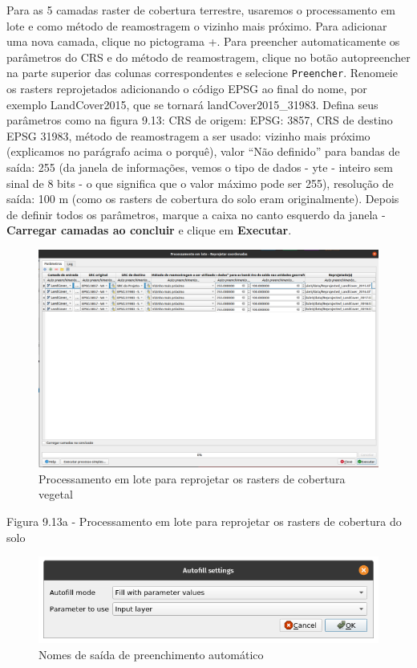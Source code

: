\documentclass[
  portuguese,
]{krantz}
\begin{document}
Para as 5 camadas raster de cobertura terrestre, usaremos o processamento em lote e como método de reamostragem o vizinho mais próximo. Para adicionar uma nova camada, clique no pictograma +. Para preencher automaticamente os parâmetros do CRS e do método de reamostragem, clique no botão autopreencher na parte superior das colunas correspondentes e selecione \texttt{Preencher}. Renomeie os rasters reprojetados adicionando o código EPSG ao final do nome, por exemplo LandCover2015, que se tornará landCover2015\_31983. Defina seus parâmetros como na figura 9.13: CRS de origem: EPSG: 3857, CRS de destino EPSG 31983, método de reamostragem a ser usado: vizinho mais próximo (explicamos no parágrafo acima o porquê), valor ``Não definido'' para bandas de saída: 255 (da janela de informações, vemos o tipo de dados - yte - inteiro sem sinal de 8 bits - o que significa que o valor máximo pode ser 255), resolução de saída: 100 m (como os rasters de cobertura do solo eram originalmente). Depois de definir todos os parâmetros, marque a caixa no canto esquerdo da janela - \textbf{Carregar camadas ao concluir} e clique em \textbf{Executar}.

\begin{figure}
\centering
\includegraphics{media/modulo9/fig913_a.png}
\caption{Processamento em lote para reprojetar os rasters de cobertura vegetal}
\end{figure}

Figura 9.13a - Processamento em lote para reprojetar os rasters de cobertura do solo

\begin{figure}
\centering
\includegraphics{media/modulo9/fig913_b.png}
\caption{Nomes de saída de preenchimento automático}
\end{figure}
\end{document}
